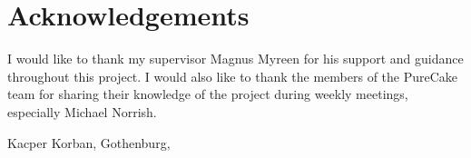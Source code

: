 \thispagestyle{plain}			%
\section*{Acknowledgements}
I would like to thank my supervisor Magnus Myreen for his support and guidance
throughout this project. I would also like to thank the members of the PureCake
team for sharing their knowledge of the project during weekly meetings,
especially Michael Norrish.

\vspace{1.5cm}
\hfill
Kacper Korban, Gothenburg, \monthname \space \the\year

\newpage				%
\thispagestyle{empty}
\mbox{}